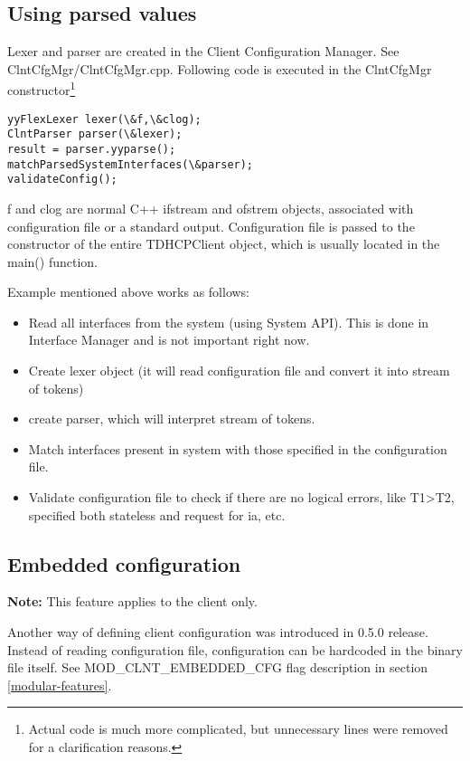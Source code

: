 \subsection{Using parsed values}

Lexer and parser are created in the Client Configuration Manager. See
ClntCfgMgr/ClntCfgMgr.cpp. Following code is executed in the ClntCfgMgr
constructor\footnote{Actual code is much more complicated, but
unnecessary lines were removed for a clarification reasons.}

\begin{verbatim}
yyFlexLexer lexer(\&f,\&clog);
ClntParser parser(\&lexer);
result = parser.yyparse();
matchParsedSystemInterfaces(\&parser);
validateConfig();
\end{verbatim}

f and clog are normal C++ ifstream and ofstrem objects, associated with
configuration file or a standard output. Configuration file is passed to
the constructor of the entire TDHCPClient object, which is usually
located in the main() function.

Example mentioned above works as follows:

\begin{itemize}
 \item Read all interfaces from the system (using System API). This is done in
       Interface Manager and is not important right now.
 \item Create lexer object (it will read configuration file and convert it into stream
       of tokens)
 \item create parser, which will interpret stream of tokens.
 \item Match interfaces present in system with those specified in the configuration
       file.
 \item Validate configuration file to check if there are no logical errors, like T1>T2,
       specified both stateless and request for ia, etc.
\end{itemize}

\subsection{Embedded configuration}

\textbf{Note:} This feature applies to the client only.

Another way of defining client configuration was introduced in 0.5.0
release. Instead of reading configuration file, configuration can be
hardcoded in the binary file itself. See MOD\_CLNT\_EMBEDDED\_CFG flag
description in section \ref{modular-features}.
